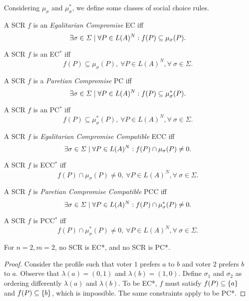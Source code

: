 \documentclass[version=3.21, pagesize, notitlepage, twoside=off, bibliography=totoc, DIV=calc, fontsize=12pt, a4paper]{scrartcl}
\newcommand{\musigma}{\mu_{\sigma}}
\newcommand{\mustar}{\mu_{\sigma}^*}
\begin{document}
Considering $\musigma$ and $\mustar$, we define some classes of social choice rules.
\begin{definition} A SCR $f$ is an \textit{Egalitarian Compromise} EC iff \[\exists \sigma \in \Sigma \suchthat \forall P \in L(A)^N: f(P) \subseteq \musigma(P).\]
\end{definition}

\begin{definition} A SCR $f$ is an EC$^*$ iff \[f(P) \subseteq \musigma(P), \ \forall P \in L(A)^N, \forall \ \sigma \in \Sigma.\]
\end{definition}

\begin{definition} A SCR $f$ is a \textit{Paretian Compromise} PC iff \[\exists \sigma \in \Sigma \suchthat \forall P \in L(A)^N: f(P) \subseteq \mustar(P).\]
\end{definition}

\begin{definition} A SCR $f$ is an PC$^*$ iff \[f(P) \subseteq \mustar(P), \ \forall P \in L(A)^N, \forall \ \sigma \in \Sigma.\]
\end{definition}

\begin{definition} A SCR $f$ is \textit{Egalitarian Compromise Compatible} ECC iff \[\exists \sigma \in \Sigma \suchthat \forall P \in L(A)^N: f(P) \cap \musigma(P) \neq 0.\]
\end{definition}

\begin{definition} A SCR $f$ is ECC$^*$ iff \[f(P) \cap \musigma(P) \neq 0, \ \forall P \in L(A)^N, \forall \ \sigma \in \Sigma.\]
\end{definition}

\begin{definition} A SCR $f$ is \textit{Paretian Compromise Compatible} PCC iff \[\exists \sigma \in \Sigma \suchthat \forall P \in L(A)^N: f(P) \cap \mustar(P) \neq 0.\]
\end{definition}

\begin{definition} A SCR $f$ is PCC$^*$ iff \[ f(P) \cap \mustar(P) \neq 0, \ \forall P \in L(A)^N, \forall \ \sigma \in \Sigma.\]
\end{definition}

\begin{proposition}
	For $n=2, m=2$, no SCR is EC*, and no SCR is PC*.
\end{proposition}
\begin{proof}
	Consider the profile such that voter $1$ prefers $a$ to $b$ and voter $2$ prefers $b$ to $a$. Observe that $\lambda(a) = (0, 1)$ and $\lambda(b) = (1, 0)$. Define $\sigma_1$ and $\sigma_2$ as ordering differently $\lambda(a)$ and $\lambda(b)$. To be EC*, $f$ must satisfy $f(P) \subseteq \{a\}$ and $f(P) \subseteq \{b\}$, which is impossible. The same constraints apply to be PC*.
\end{proof}
\end{document}

